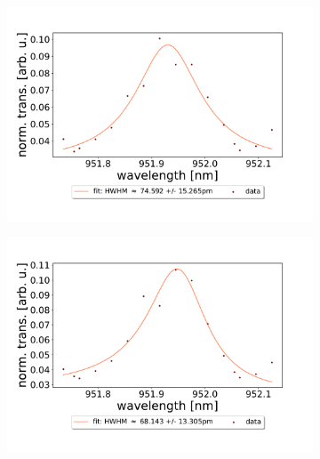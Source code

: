 \begin{figure}[h!]
\begin{subfigure}[b]{0.49\textwidth}
        \includegraphics[width=\textwidth]{figures/results/double fano fits/20250326/33um_M3:M5_fit_5.pdf}
        \caption{}
        \label{fig:33um_M3:M5_fit_5}
    \end{subfigure}
    \begin{subfigure}[b]{0.49\textwidth}
        \includegraphics[width=\textwidth]{figures/results/double fano fits/20250326/33um_M3:M5_fit_6.pdf}
        \caption{}
        \label{fig:33um_M3:M5_fit_6}
    \end{subfigure}
\end{figure}

